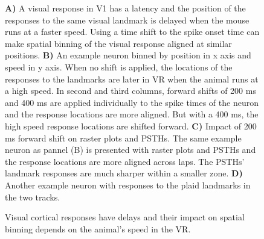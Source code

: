 \begin{figure}
    \caption{Visual cortical responses have delays and their impact on spatial binning depends on the animal's speed in the VR. }
\medskip
\small
\textbf{A)} A visual response in V1 has a latency and the position of the responses to the same visual landmark is delayed when the mouse runs at a faster speed. Using a time shift to the spike onset time can make spatial binning of the visual response aligned at similar positions. \textbf{B)} An example neuron binned by position in x axis and speed in y axis. When no shift is applied, the locations of the responses to the landmarks are later in VR when the animal runs at a high speed. In second and third columns, forward shifts of 200 ms and 400 ms are applied individually to the spike times of the neuron and the response locations are more aligned. But with a 400 ms, the high speed response locations are shifted forward. \textbf{C)} Impact of 200 ms forward shift on raster plots and PSTHs. The same example neuron as pannel (B) is presented with raster plots and PSTHs and the response locations are more aligned across laps. The PSTHs' landmark responses are much sharper within a smaller zone. \textbf{D)} Another example neuron with responses to the plaid landmarks in the two tracks. 
    \label{fig:placeholder}
\end{figure}
